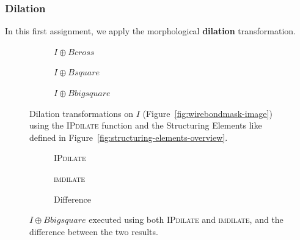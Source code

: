 \documentclass{article}
\begin{document}
\subsubsection*{Dilation} In this first assignment, we apply the morphological \textbf{dilation} transformation. 
\begin{figure}[H]
     \centering
     \begin{subfigure}[b]{0.3\textwidth}
         \centering
         
         \caption{$I \oplus Bcross$}
         \label{fig:wirebondmask_Bcross_dilated}
     \end{subfigure}
     \hfill
     \begin{subfigure}[b]{0.3\textwidth}
         \centering
         
         \caption{$I \oplus Bsquare$}
         \label{fig:wirebondmask_Bsquare_dilated}
     \end{subfigure}
     \hfill
     \begin{subfigure}[b]{0.3\textwidth}
         \centering
         
         \caption{$I \oplus Bbigsquare$}
         \label{fig:wirebondmask_Bbigsquare_dilated}
     \end{subfigure}
     
    \caption{Dilation transformations on $I$ (Figure~\ref{fig:wirebondmask-image}) using the \textsc{IPdilate} function and the Structuring Elements like defined in Figure~\ref{fig:structuring-elements-overview}.}
    \label{fig:wirebondmask_dilated}
\end{figure}

\begin{figure}[H]
     \centering
     \begin{subfigure}[b]{0.3\textwidth}
         \centering
         
         \caption{\textsc{IPdilate}}
         \label{fig:wirebondmask_Bbigsquare_IPdilate}
     \end{subfigure}
     \hfill
     \begin{subfigure}[b]{0.3\textwidth}
         \centering
         
         \caption{\textsc{imdilate}}
         \label{fig:wirebondmask_Bbigsquare_imdilate}
     \end{subfigure}
     \hfill
     \begin{subfigure}[b]{0.3\textwidth}
         \centering
         
         \caption{Difference}
         \label{fig:wirebondmask_Bbigsquare_dilate_diff}
     \end{subfigure}
     
    \caption{$I \oplus Bbigsquare$ executed using both \textsc{IPdilate} and \textsc{imdilate}, and the difference between the two results.}
    \label{fig:wirebondmask_dilate_diff}
\end{figure}
\end{document}
